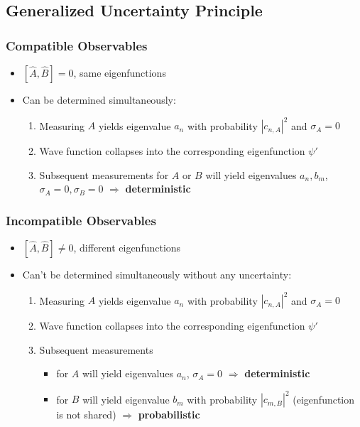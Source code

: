 \subsection{Generalized Uncertainty Principle}
\subsubsection{Compatible Observables}

\begin{itemize}
    \item $[\widehat{A}, \widehat{B}] = 0$, same eigenfunctions
    \item Can be determined simultaneously:
          \begin{enumerate}
              \item Measuring $A$ yields eigenvalue $a_n$ with probability $|c_{n,A}|^2$ and $\sigma_A=0$
              \item Wave function collapses into the corresponding eigenfunction $\psi'$
              \item Subsequent measurements for $A$ or $B$ will yield eigenvalues $a_n, b_m$, $\sigma_A=0, \sigma_B=0$ $\Rightarrow$ \textbf{deterministic}
          \end{enumerate}
\end{itemize}

\subsubsection{Incompatible Observables}

\begin{itemize}
    \item $[\widehat{A}, \widehat{B}] \neq 0$, different eigenfunctions
    \item Can't be determined simultaneously without any uncertainty:
          \begin{enumerate}
              \item Measuring $A$ yields eigenvalue $a_n$ with probability $|c_{n,A}|^2$ and $\sigma_A=0$
              \item Wave function collapses into the corresponding eigenfunction $\psi'$
              \item Subsequent measurements
                    \begin{itemize}
                        \item for $A$ will yield eigenvalues $a_n$, $\sigma_A=0$ $\Rightarrow$ \textbf{deterministic}
                        \item for $B$ will yield eigenvalue $b_m$ with probability $|c_{m,B}|^2$ (eigenfunction is not shared) $\Rightarrow$ \textbf{probabilistic}
                    \end{itemize}
          \end{enumerate}
\end{itemize}

